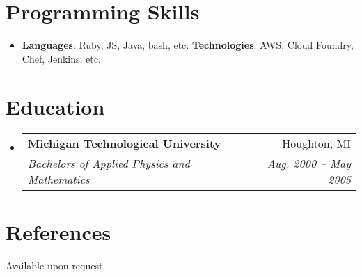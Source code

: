 \documentclass[letterpaper,12pt]{article}
\makeatletter
\newcommand{\resumeSubheading}[4]{
  \vspace{-1pt}\item{
    \begin{tabular*}{0.97\textwidth}{l@{\extracolsep{\fill}}r}
      \textbf{#1} & #2 \\
      \textit{\small#3} & \textit{\small #4} \\
    \end{tabular*}\vspace{-5pt}}
}
\newcommand{\resumeSubHeadingListStart}{\begin{itemize}[leftmargin=*]}
\newcommand{\resumeSubHeadingListEnd}{\end{itemize}}
\makeatother
\begin{document}
  \section{Programming Skills}
  \resumeSubHeadingListStart
    \item{
      \textbf{Languages}{: Ruby, JS, Java, bash, etc.}
        \hfill
      \textbf{Technologies}{: AWS, Cloud Foundry, Chef, Jenkins, etc.}
    }
  \resumeSubHeadingListEnd

  \section{Education}
  \resumeSubHeadingListStart
  \resumeSubheading
  {Michigan Technological University}{Houghton, MI}
  {Bachelors of Applied Physics and Mathematics}{Aug. 2000 -- May 2005}
  \resumeSubHeadingListEnd

  \section{References}
  Available upon request.

\end{document}
